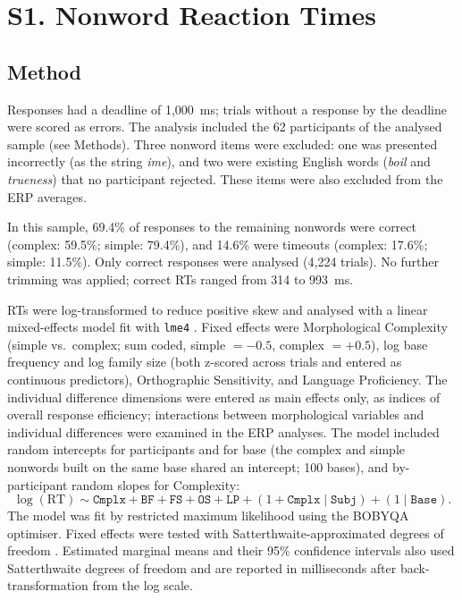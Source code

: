 
\section*{S1. Nonword Reaction Times}

\subsection*{Method}

Responses had a deadline of 1,000~ms; trials without a response by the deadline were scored as errors. The analysis included the 62 participants of the analysed sample (see Methods). Three nonword items were excluded: one was presented incorrectly (as the string \textit{ime}), and two were existing English words (\textit{boil} and \textit{trueness}) that no participant rejected. These items were also excluded from the ERP averages.

In this sample, 69.4\% of responses to the remaining nonwords were correct (complex: 59.5\%; simple: 79.4\%), and 14.6\% were timeouts (complex: 17.6\%; simple: 11.5\%). Only correct responses were analysed (4,224 trials). No further trimming was applied; correct RTs ranged from 314 to 993~ms.

RTs were log-transformed to reduce positive skew and analysed with a linear mixed-effects model fit with \texttt{lme4} \citep{batesFittingLinearMixedeffects2015}. Fixed effects were Morphological Complexity (simple vs.\ complex; sum coded, simple $= -0.5$, complex $= +0.5$), log base frequency and log family size (both z-scored across trials and entered as continuous predictors), Orthographic Sensitivity, and Language Proficiency. The individual difference dimensions were entered as main effects only, as indices of overall response efficiency; interactions between morphological variables and individual differences were examined in the ERP analyses. The model included random intercepts for participants and for base (the complex and simple nonwords built on the same base shared an intercept; 100 bases), and by-participant random slopes for Complexity:
\[
\log(\mathrm{RT}) \sim \texttt{Cmplx} + \texttt{BF} + \texttt{FS} + \texttt{OS} + \texttt{LP} + (1 + \texttt{Cmplx} \mid \texttt{Subj}) + (1 \mid \texttt{Base}).
\]
The model was fit by restricted maximum likelihood using the BOBYQA optimiser. Fixed effects were tested with Satterthwaite-approximated degrees of freedom \citep{kuznetsovaLmerTestPackageTests2017}. Estimated marginal means and their 95\% confidence intervals also used Satterthwaite degrees of freedom and are reported in milliseconds after back-transformation from the log scale.

